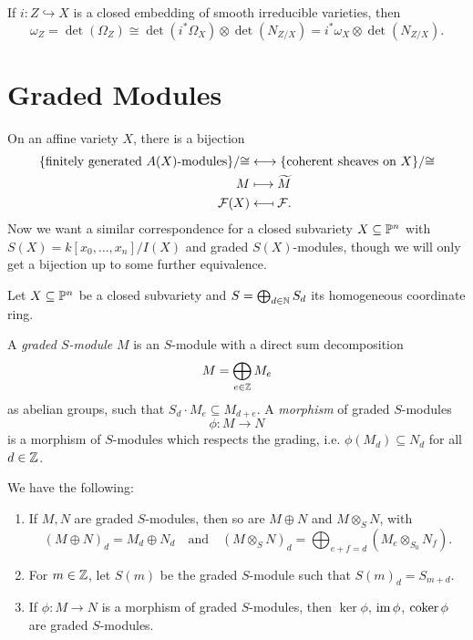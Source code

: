 \begin{corollary}
  If $i : Z \hookrightarrow X$ is a closed
  embedding of smooth irreducible varieties,
  then
  \[
    \omega_Z
    = \det(\Omega_Z)
    \cong \det(i^* \Omega_X) \otimes \det(N_{Z / X})
    = i^* \omega_X \otimes \det(N_{Z / X}).
  \]
\end{corollary}

\section{Graded Modules}

\begin{remark}
  On an affine variety $X$, there is a
  bijection
  \begin{align*}
    \{\text{finitely generated $A(X)$-modules}\} / {\cong}
    &\longleftrightarrow
    \{\text{coherent sheaves on $X$}\} / {\cong} \\
    M &\longmapsto \widetilde{M} \\
    \mathcal{F}(X)
    &\mathrel{\reflectbox{\ensuremath{\longmapsto}}}
    \mathcal{F}.
  \end{align*}
  Now we want a similar correspondence
  for a closed subvariety
  $X \subseteq \mathbb{P}^n$ with
  $S(X) = k[x_0, \dots, x_n] / I(X)$ and
  graded $S(X)$-modules, though we will
  only get a bijection up to some further
  equivalence.
\end{remark}

\begin{remark}
  Let $X \subseteq \mathbb{P}^n$ be a closed
  subvariety and $S = \bigoplus_{d \in \mathbb{N}} S_d$
  its homogeneous coordinate ring.
\end{remark}

\begin{definition}\label{def:graded-module}
  A \emph{graded $S$-module} $M$ is an
  $S$-module with a direct sum decomposition
  \[
    M = \bigoplus_{e \in \mathbb{Z}} M_e
  \]
  as abelian groups, such that
  $S_d \cdot M_e \subseteq M_{d + e}$.
  A \emph{morphism} of graded $S$-modules
  \[
    \phi : M \longrightarrow N
  \]
  is a morphism of $S$-modules which
  respects the grading, i.e.
  $\phi(M_d) \subseteq N_d$ for all
  $d \in \mathbb{Z}$.
\end{definition}

\begin{example}
  We have the following:
  \begin{enumerate}
    \item If $M, N$ are graded $S$-modules,
      then so are $M \oplus N$ and
      $M \otimes_S N$, with
      \[
        (M \oplus N)_d
        = M_d \oplus N_d \quad \text{and} \quad
        (M \otimes_S N)_d = \bigoplus_{e + f = d} (M_e \otimes_{S_0} N_f).
      \]
    \item For $m \in \mathbb{Z}$, let $S(m)$
      be the graded $S$-module such that
      $S(m)_d = S_{m + d}$.
    \item If $\phi : M \to N$ is a
      morphism of graded $S$-modules, then
      $\ker \phi$, $\operatorname{im} \phi$, $\operatorname{coker} \phi$ are
      graded $S$-modules.
  \end{enumerate}
\end{example}

